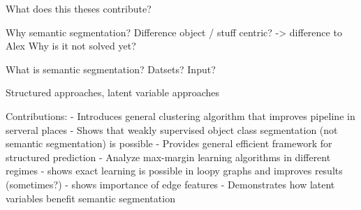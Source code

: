 

What does this theses contribute?

Why semantic segmentation? Difference object / stuff centric? -> difference to Alex
Why is it not solved yet?

What is semantic segmentation?
Datsets? Input?

Structured approaches, latent variable approaches

Contributions:
- Introduces general clustering algorithm that improves pipeline in serveral places
- Shows that weakly supervised object class segmentation (not semantic segmentation) is possible
- Provides general efficient framework for structured prediction
- Analyze max-margin learning algorithms in different regimes
- shows exact learning is possible in loopy graphs and improves results (sometimes?)
- shows importance of edge features
- Demonstrates how latent variables benefit semantic segmentation
